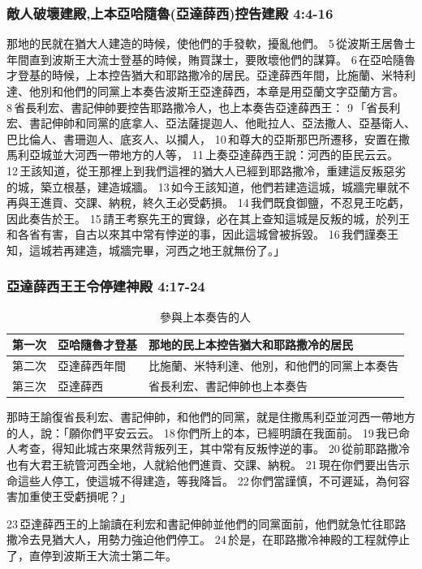\subsubsection{敵人破壞建殿,上本亞哈隨魯(亞達薛西)控告建殿 4:4-16}
那地的民就在猶大人建造的時候，使他們的手發軟，擾亂他們。 5 從波斯王居魯士年間直到波斯王大流士登基的時候，賄買謀士，要敗壞他們的謀算。 6 在亞哈隨魯才登基的時候，上本控告猶大和耶路撒冷的居民。亞達薛西年間，比施蘭、米特利達、他別和他們的同黨上本奏告波斯王亞達薛西，本章是用亞蘭文字亞蘭方言。 8 省長利宏、書記伸帥要控告耶路撒冷人，也上本奏告亞達薛西王： 9 「省長利宏、書記伸帥和同黨的底拿人、亞法薩提迦人、他毗拉人、亞法撒人、亞基衛人、巴比倫人、書珊迦人、底亥人、以攔人， 10 和尊大的亞斯那巴所遷移，安置在撒馬利亞城並大河西一帶地方的人等， 11 上奏亞達薛西王說：河西的臣民云云。 12 王該知道，從王那裡上到我們這裡的猶大人已經到耶路撒冷，重建這反叛惡劣的城，築立根基，建造城牆。 13 如今王該知道，他們若建造這城，城牆完畢就不再與王進貢、交課、納稅，終久王必受虧損。 14 我們既食御鹽，不忍見王吃虧，因此奏告於王。 15 請王考察先王的實錄，必在其上查知這城是反叛的城，於列王和各省有害，自古以來其中常有悖逆的事，因此這城曾被拆毀。 16 我們謹奏王知，這城若再建造，城牆完畢，河西之地王就無份了。」


\subsubsection{亞達薛西王王令停建神殿 4:17-24}
\begin{table}[!hbp]
\centering 
\begin{tabular}{|p{1.5cm}|p{3cm}|p{8cm}|}
\hline
\hline
第一次 & 亞哈隨魯才登基&那地的民上本控告猶大和耶路撒冷的居民  \\\hline
第二次 & 亞達薛西年間  &比施蘭、米特利達、他別，和他們的同黨上本奏告\\\hline
第三次 & 亞達薛西      &省長利宏、書記伸帥也上本奏告   \\\hline
\end{tabular}
\caption{參與上本奏告的人}
\end{table}
那時王諭復省長利宏、書記伸帥，和他們的同黨，就是住撒馬利亞並河西一帶地方的人，說：「願你們平安云云。 18 你們所上的本，已經明讀在我面前。 19 我已命人考查，得知此城古來果然背叛列王，其中常有反叛悖逆的事。 20 從前耶路撒冷也有大君王統管河西全地，人就給他們進貢、交課、納稅。 21 現在你們要出告示命這些人停工，使這城不得建造，等我降旨。 22 你們當謹慎，不可遲延，為何容害加重使王受虧損呢？」

23 亞達薛西王的上諭讀在利宏和書記伸帥並他們的同黨面前，他們就急忙往耶路撒冷去見猶大人，用勢力強迫他們停工。 24 於是，在耶路撒冷神殿的工程就停止了，直停到波斯王大流士第二年。


